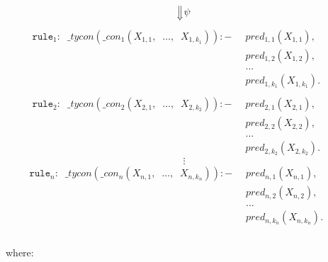 \documentclass{report}
\theoremstyle{definition}
\theoremstyle{definition}
\newcommand{\ttt}[1]{\texttt{#1}}
\newcommand{\tav}{\;\;}
\newcommand{\SLongdownarrow}{\mathrel{\rotatebox[origin=c]{-90}{$\Longrightarrow$}}}
\begin{document}
$$\SLongdownarrow \psi$$
\begin{align*}
	\ttt{rule}_1: \tav \_ tycon (\_ con_1(X_{1,1}, \tav \ldots, \tav X_{1,k_1})) :-&
	\tav pred_{1, 1}(X_{1,1}), && \\
	& \tav pred_{1, 2}(X_{1,2}), && \\
	& \tav \ldots \tav && \\
	& \tav pred_{1, k_1}(X_{1,k_1}). && \\
	\\
	\ttt{rule}_2: \tav \_ tycon (\_ con_2(X_{2,1}, \tav \ldots, \tav X_{2,k_2})) :-&
	\tav pred_{2, 1}(X_{2,1}), && \\
	& \tav pred_{2, 2}(X_{2,2}), && \\
	& \tav \ldots \tav && \\
	& \tav pred_{2, k_2}(X_{2,k_2}). &&
\end{align*}
$$\vdots$$
\begin{align*}
	\ttt{rule}_n: \tav \_ tycon (\_ con_n(X_{n,1}, \tav \ldots, \tav X_{n,k_n})) :-&
	\tav pred_{n, 1}(X_{n,1}), && \\
	& \tav pred_{n, 2}(X_{n,2}), && \\
	& \tav \ldots \tav && \\
	& \tav pred_{n, k_n}(X_{n,k_n}). && \\
\end{align*}\\
where:
\end{document}
